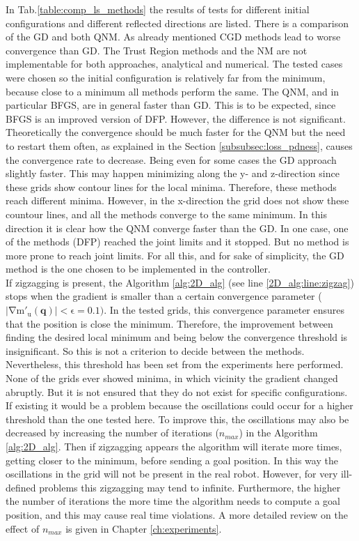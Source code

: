 In Tab.\ref{table:comp_ls_methods} the results of tests for different initial configurations and different reflected directions are listed. There is a comparison of the GD and both QNM. As already mentioned CGD methods lead to worse convergence than GD. The Trust Region methods and the NM are not implementable for both approaches, analytical and numerical.
The tested cases were chosen so the initial configuration is relatively far from the minimum, because close to a minimum all methods perform the same.
The QNM, and in particular BFGS, are in general faster than GD. This is to be expected, since BFGS is an improved version of DFP. However, the difference is not significant. Theoretically the convergence should be much faster for the QNM but the need to restart them often, as explained in the Section \ref{subsubsec:loss_pdness}, causes the convergence rate to decrease. Being even for some cases the GD approach slightly faster. This may happen minimizing along the y- and z-direction since these grids show contour lines for the local minima. Therefore, these methods reach different minima. However, in the x-direction the grid does not show these countour lines, and all the methods converge to the same minimum. In this direction it is clear how the QNM converge faster than the GD.
In one case, one of the methods (DFP) reached the joint limits and it stopped. But no method is more prone to reach joint limits. For all this, and for sake of simplicity, the GD method is the one chosen to be implemented in the controller.\\
If zigzagging is present, the Algorithm \ref{alg:2D_alg} (see line \ref{2D_alg:line:zigzag}) stops when the gradient is smaller than a certain convergence parameter ($\mathrm{|\nabla m'_u(\mathbf{q})| < \epsilon=0.1 )}$.
In the tested grids, this convergence parameter ensures that the position is close the minimum. Therefore, the improvement between finding the desired local minimum and being below the convergence threshold is insignificant. So this is not a criterion to decide between the methods.
Nevertheless, this threshold has been set from the experiments here performed. None of the grids ever showed minima, in which vicinity the gradient changed abruptly. But it is not ensured that they do not exist for specific configurations. If existing it would be a problem because the oscillations could occur for a higher threshold than the one tested here. To improve this, the oscillations may also be decreased by increasing the number of iterations ($n_{max}$) in the Algorithm \ref{alg:2D_alg}. Then if zigzagging appears the algorithm will iterate more times, getting closer to the minimum, before sending a goal position. In this way the oscillations in the grid will not be present in the real robot. However, for very ill-defined problems this zigzagging may tend to infinite. Furthermore, the higher the number of iterations the more time the algorithm needs to compute a goal position, and this may cause real time violations. A more detailed review on the effect of $n_{max}$ is given in Chapter \ref{ch:experiments}. 

